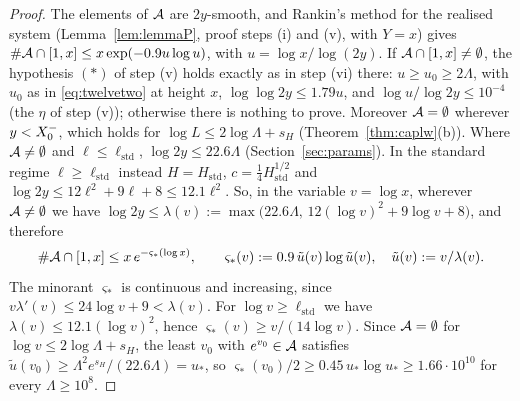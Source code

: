 \begin{proof}
The elements of $\mathcal{A}$ are $2y$-smooth, and Rankin's method for the realised system (Lemma~\ref{lem:lemmaP}, proof steps (i) and (v),
with $Y=x$) gives $\#\mathcal{A}\cap[1,x]\le x\exp(-0.9u\log u)$, with $u=\log x/\log(2y)$.
If $\mathcal{A}\cap[1,x]\ne\emptyset$, the hypothesis $(*)$ of step (v) holds exactly as in step (vi) there: $u\ge u_0\ge2\Lambda$, with $u_0$
as in \eqref{eq:twelvetwo} at height $x$, $\log\log2y\le1.79u$, and $\log u/\log2y\le10^{-4}$ (the $\eta$ of step (v)); otherwise there is nothing to prove. Moreover
$\mathcal{A}=\emptyset$ wherever $y<X_0^{-}$, which holds for $\log L\le2\log\Lambda+s_H$ (Theorem~\ref{thm:caplw}(b)). Where $\mathcal{A}\ne\emptyset$ and $\ell\le\ell_{\mathrm{std}}$,
$\log2y\le22.6\Lambda$ (Section~\ref{sec:params}). In the standard regime $\ell\ge\ell_{\mathrm{std}}$ instead $H=H_{\mathrm{std}}$,
$c=\tfrac14H_{\mathrm{std}}^{1/2}$ and $\log2y\le12\ell^2+9\ell+8\le12.1\ell^2$.
So, in the variable $v=\log x$, wherever $\mathcal{A}\ne\emptyset$ we have $\log2y\le\lambda(v):=\max\bigl(22.6\Lambda,\,12(\log v)^2+9\log v+8\bigr)$,
and therefore
\[
  \#\mathcal{A}\cap[1,x]\le x\,e^{-\varsigma_*(\log x)},\qquad \varsigma_*(v):=0.9\,\tilde u(v)\log\tilde u(v),\quad \tilde u(v):=v/\lambda(v).
\]
The minorant $\varsigma_*$ is continuous and increasing, since $v\lambda'(v)\le24\log v+9<\lambda(v)$. For $\log v\ge\ell_{\mathrm{std}}$ we have
$\lambda(v)\le12.1(\log v)^2$, hence $\varsigma_*(v)\ge v/(14\log v)$. Since $\mathcal{A}=\emptyset$ for $\log v\le2\log\Lambda+s_H$, the
least $v_0$ with $e^{v_0}\in\mathcal{A}$ satisfies $\tilde u(v_0)\ge\Lambda^2e^{s_H}/(22.6\Lambda)=u_*$, so
$\varsigma_*(v_0)/2\ge0.45\,u_*\log u_*\ge1.66\cdot10^{10}$ for every $\Lambda\ge10^8$.


\end{proof}
